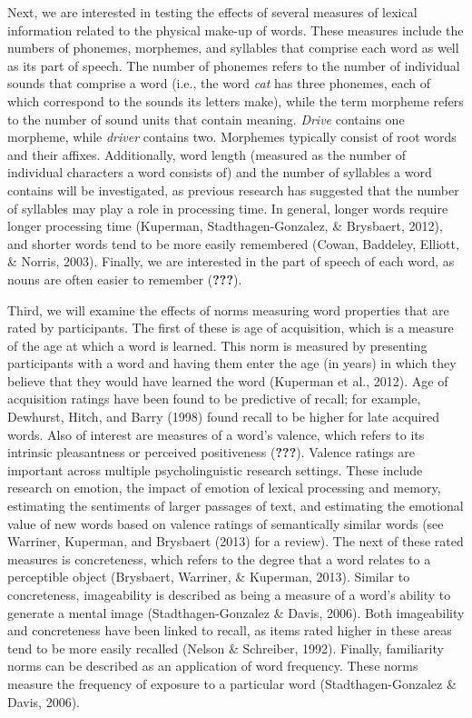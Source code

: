 \documentclass[english,man]{apa6}
\theoremstyle{definition}
\theoremstyle{definition}
\theoremstyle{definition}
\theoremstyle{remark}
\begin{document}
Next, we are interested in testing the effects of several measures of
lexical information related to the physical make-up of words. These
measures include the numbers of phonemes, morphemes, and syllables that
comprise each word as well as its part of speech. The number of phonemes
refers to the number of individual sounds that comprise a word (i.e.,
the word \emph{cat} has three phonemes, each of which correspond to the
sounds its letters make), while the term morpheme refers to the number
of sound units that contain meaning. \emph{Drive} contains one morpheme,
while \emph{driver} contains two. Morphemes typically consist of root
words and their affixes. Additionally, word length (measured as the
number of individual characters a word consists of) and the number of
syllables a word contains will be investigated, as previous research has
suggested that the number of syllables may play a role in processing
time. In general, longer words require longer processing time (Kuperman,
Stadthagen-Gonzalez, \& Brysbaert, 2012), and shorter words tend to be
more easily remembered (Cowan, Baddeley, Elliott, \& Norris, 2003).
Finally, we are interested in the part of speech of each word, as nouns
are often easier to remember ({\textbf{???}}).

Third, we will examine the effects of norms measuring word properties
that are rated by participants. The first of these is age of
acquisition, which is a measure of the age at which a word is learned.
This norm is measured by presenting participants with a word and having
them enter the age (in years) in which they believe that they would have
learned the word (Kuperman et al., 2012). Age of acquisition ratings
have been found to be predictive of recall; for example, Dewhurst,
Hitch, and Barry (1998) found recall to be higher for late acquired
words. Also of interest are measures of a word's valence, which refers
to its intrinsic pleasantness or perceived positiveness
({\textbf{???}}). Valence ratings are important across multiple
psycholinguistic research settings. These include research on emotion,
the impact of emotion of lexical processing and memory, estimating the
sentiments of larger passages of text, and estimating the emotional
value of new words based on valence ratings of semantically similar
words (see Warriner, Kuperman, and Brysbaert (2013) for a review). The
next of these rated measures is concreteness, which refers to the degree
that a word relates to a perceptible object (Brysbaert, Warriner, \&
Kuperman, 2013). Similar to concreteness, imageability is described as
being a measure of a word's ability to generate a mental image
(Stadthagen-Gonzalez \& Davis, 2006). Both imageability and concreteness
have been linked to recall, as items rated higher in these areas tend to
be more easily recalled (Nelson \& Schreiber, 1992). Finally,
familiarity norms can be described as an application of word frequency.
These norms measure the frequency of exposure to a particular word
(Stadthagen-Gonzalez \& Davis, 2006).
\end{document}
